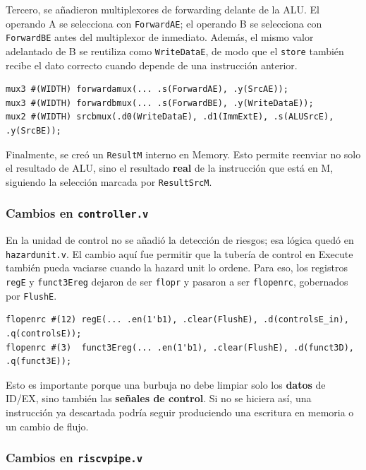 \documentclass[11pt,a4paper]{article}
\begin{document}
Tercero, se añadieron multiplexores de forwarding delante de la ALU. El operando A se
selecciona con \texttt{ForwardAE}; el operando B se selecciona con
\texttt{ForwardBE} antes del multiplexor de inmediato. Además, el mismo valor adelantado
de B se reutiliza como \texttt{WriteDataE}, de modo que el \texttt{store} también recibe
el dato correcto cuando depende de una instrucción anterior.

\begin{lstlisting}
mux3 #(WIDTH) forwardamux(... .s(ForwardAE), .y(SrcAE));
mux3 #(WIDTH) forwardbmux(... .s(ForwardBE), .y(WriteDataE));
mux2 #(WIDTH) srcbmux(.d0(WriteDataE), .d1(ImmExtE), .s(ALUSrcE), .y(SrcBE));
\end{lstlisting}

Finalmente, se creó un \texttt{ResultM} interno en Memory. Esto permite reenviar no solo
el resultado de ALU, sino el resultado \textbf{real} de la instrucción que está en M,
siguiendo la selección marcada por \texttt{ResultSrcM}.

\subsubsection{Cambios en \texttt{controller.v}}

En la unidad de control no se añadió la detección de riesgos; esa lógica quedó en
\texttt{hazardunit.v}. El cambio aquí fue permitir que la tubería de control en Execute
también pueda vaciarse cuando la hazard unit lo ordene. Para eso, los registros
\texttt{regE} y \texttt{funct3Ereg} dejaron de ser \texttt{flopr} y pasaron a ser
\texttt{flopenrc}, gobernados por \texttt{FlushE}.

\begin{lstlisting}
flopenrc #(12) regE(... .en(1'b1), .clear(FlushE), .d(controlsE_in), .q(controlsE));
flopenrc #(3)  funct3Ereg(... .en(1'b1), .clear(FlushE), .d(funct3D), .q(funct3E));
\end{lstlisting}

Esto es importante porque una burbuja no debe limpiar solo los \textbf{datos} de ID/EX,
sino también las \textbf{señales de control}. Si no se hiciera así, una instrucción ya
descartada podría seguir produciendo una escritura en memoria o un cambio de flujo.

\subsubsection{Cambios en \texttt{riscvpipe.v}}
\end{document}
